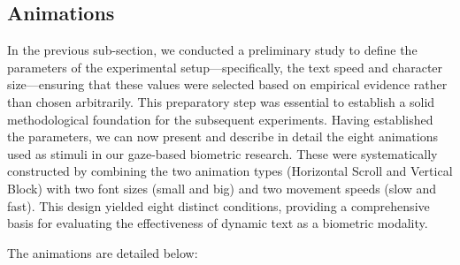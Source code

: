 \documentclass[12pt]{report}
\begin{document}
\subsection{Animations}

In the previous sub-section, we conducted a preliminary study to define the parameters of the experimental setup—specifically, the text speed and character size—ensuring that these values were selected based on empirical evidence rather than chosen arbitrarily. 
This preparatory step was essential to establish a solid methodological foundation for the subsequent experiments. 
Having established the parameters, we can now present and describe in detail the eight animations used as stimuli in our gaze-based biometric research. 
These were systematically constructed by combining the two animation types (Horizontal Scroll and Vertical Block) with two font sizes (small and big) and two movement speeds (slow and fast). 
This design yielded eight distinct conditions, providing a comprehensive basis for evaluating the effectiveness of dynamic text as a biometric modality.

The animations are detailed below:
\end{document}
